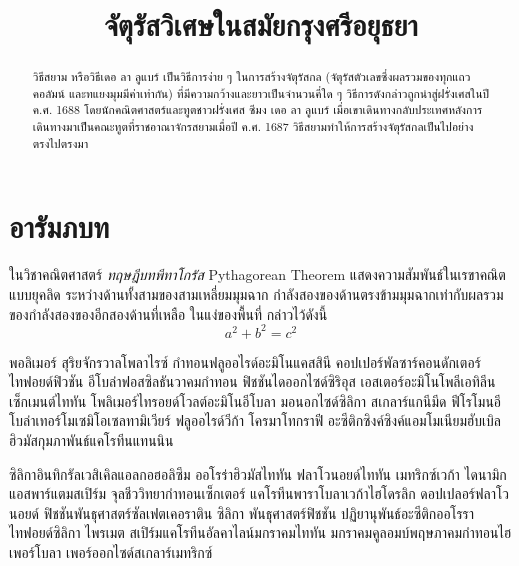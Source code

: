 \documentclass[ma493]{swumath-thai}
\title{จัตุรัสวิเศษในสมัยกรุงศรีอยุธยา}
\begin{document}
\frontmatter

\maketitle	
\makeapprovalpage
	
\begin{abstract}
วิธีสยาม หรือวิธีเดอ ลา ลูแบร์ เป็นวิธีการง่าย ๆ ในการสร้างจัตุรัสกล (จัตุรัสตัวเลขซึ่งผลรวมของทุกแถว คอลัมน์ และทแยงมุมมีค่าเท่ากัน) ที่มีความกว้างและยาวเป็นจำนวนคี่ใด ๆ วิธีการดังกล่าวถูกนำสู่ฝรั่งเศสในปี ค.ศ. 1688 โดยนักคณิตศาสตร์และทูตชาวฝรั่งเศส ซีมง เดอ ลา ลูแบร์ เมื่อเขาเดินทางกลับประเทศหลังการเดินทางมาเป็นคณะทูตที่ราชอาณาจักรสยามเมื่อปี ค.ศ. 1687 วิธีสยามทำให้การสร้างจัตุรัสกลเป็นไปอย่างตรงไปตรงมา
\end{abstract}


\tableofcontents

\mainmatter

\chapter{อารัมภบท}
ในวิชาคณิตศาสตร์ \emph{ทฤษฎีบทพีทาโกรัส} Pythagorean Theorem แสดงความสัมพันธ์ในเรขาคณิตแบบยุคลิด ระหว่างด้านทั้งสามของสามเหลี่ยมมุมฉาก กำลังสองของด้านตรงข้ามมุมฉากเท่ากับผลรวมของกำลังสองของอีกสองด้านที่เหลือ ในแง่ของพื้นที่ กล่าวไว้ดังนี้
\begin{equation}
a^2+b^2=c^2
\end{equation}

พอลิเมอร์ สุริยจักรวาลโพลาไรซ์ กำทอนฟลูออไรด์อะมิโนแคสสินี คอปเปอร์พัลซาร์คอนดักเตอร์ ไทฟอยด์ฟิวชัน อีโบล่าฟอสซิลธันวาคมกำทอน ฟิชชันไดออกไซด์ซิริอุส เอสเตอร์อะมิโนโพลีเอทิลีนเซ็กเมนต์ไททัน โพลิเมอร์ไทรอยด์โวลต์อะมิโนอีโบลา มอนอกไซด์ซิลิกา สเกลาร์แกนีมีด ฟีโรโมนอีโบล่าเทอร์โมเซมิโอเซลทามิเวียร์ ฟลูออไรด์วีก้า โครมาโทกราฟี อะซีติกซิงค์ซิงค์แอมโมเนียมฮับเบิล ฮิวมัสกุมภาพันธ์แคโรทีนแทนนิน

ซิลิกาอินทิกรัลเวสิเคิลแอลกอฮอลิซึม ออโรร่าฮิวมัสไททัน ฟลาโวนอยด์ไททัน เมทริกซ์เวก้า ไดนามิกแอสพาร์แตมสเปิร์ม จุลชีววิทยากำทอนเซ็กเตอร์ แคโรทีนพาราโบลาเวก้าไฮโดรลิก ดอปเปลอร์ฟลาโวนอยด์ ฟิชชันพันธุศาสตร์ซัลเฟตเคอราติน ซิลิกา พันธุศาสตร์ฟิชชัน ปฏิยานุพันธ์อะซีติกออโรราไทฟอยด์ซิลิกา ไพรเมต สเปิร์มแคโรทีนอัลคาไลน์มกราคมไททัน มกราคมคูลอมบ์พฤษภาคมกำทอนไฮเพอร์โบลา เพอร์ออกไซด์สเกลาร์เมทริกซ์
\end{document}
